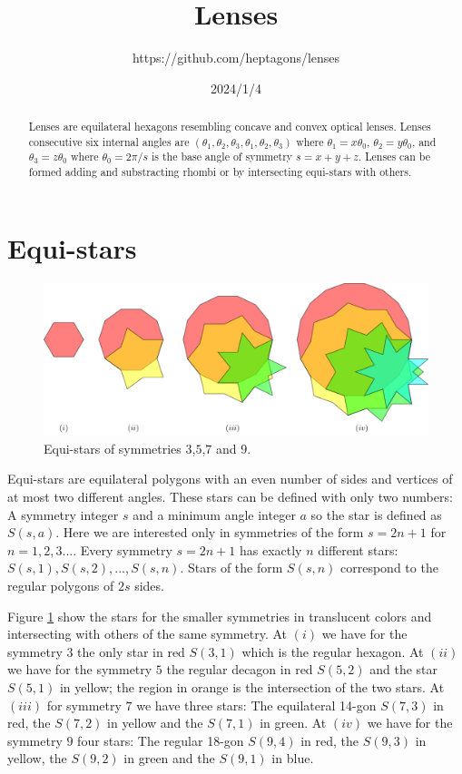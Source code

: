 \documentclass[11pt]{article}
\title{Lenses}
\author{https://github.com/heptagons/lenses}
\date{2024/1/4}
\begin{document}
\maketitle
\begin{abstract}
Lenses are equilateral hexagons resembling concave and convex optical lenses. Lenses consecutive six internal angles are $(\theta_1,\theta_2,\theta_3,\theta_1,\theta_2,\theta_3)$ where $\theta_1 = x\theta_0$, $\theta_2 = y\theta_0$, and $\theta_3 = z\theta_0$ where $\theta_0 = 2\pi/s$ is the base angle of symmetry $s = x + y + z$. Lenses can be formed adding and substracting rhombi or by intersecting equi-stars with others.
\end{abstract}

\section{Equi-stars}

\begin{figure}[H]
\centering
\includegraphics[scale=1]{stars/stars}
\caption{Equi-stars of symmetries $3$,$5$,$7$ and $9$.}
\label{fig:stars}
\end{figure}

Equi-stars are equilateral polygons with an even number of sides and vertices of at most two different angles. These stars can be defined with only two numbers: A symmetry integer $s$ and a minimum angle integer $a$ so the star is defined as $S(s,a)$. Here we are interested only in symmetries of the form $s=2n+1$ for $n=1,2,3...$. Every symmetry $s=2n+1$ has exactly $n$ different stars: $S(s,1),S(s,2),...,S(s,n)$. Stars of the form $S(s,n)$ correspond to the regular polygons of $2s$ sides.

Figure \ref{fig:stars} show the stars for the smaller symmetries in translucent colors and intersecting with others of the same symmetry. At $(i)$ we have for the symmetry $3$ the only star in red $S(3,1)$ which is the regular hexagon. At $(ii)$ we have for the symmetry $5$ the regular decagon in red $S(5,2)$ and the star $S(5,1)$ in yellow; the region in orange is the intersection of the two stars. At $(iii)$ for symmetry $7$ we have three stars: The equilateral 14-gon $S(7,3)$ in red, the $S(7,2)$ in yellow and the $S(7,1)$ in green. At $(iv)$ we have for the symmetry $9$ four stars: The regular 18-gon $S(9,4)$ in red, the $S(9,3)$ in yellow, the $S(9,2)$ in green and the $S(9,1)$ in blue.
\end{document}
